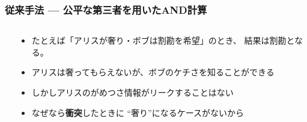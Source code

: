 \begin{frame}
  \frametitle{従来手法 --- 公平な第三者を用いたAND計算}

  \begin{columns}
    \begin{column}{0.6\textwidth}

      \pause
    \end{column}
    \begin{column}{0.4\textwidth}
      \begin{itemize}
        \item たとえば「アリスが奢り・ボブは割勘を希望」のとき、
        結果は割勘となる。
        
        \item アリスは奢ってもらえないが、ボブのケチさを知ることができる

        \item しかしアリスのがめつさ情報がリークすることはない

        \pause
        \item なぜなら\textbf{衝突}したときに
        ``奢り''になるケースがないから
      \end{itemize}
    \end{column}
  \end{columns}
\end{frame}

